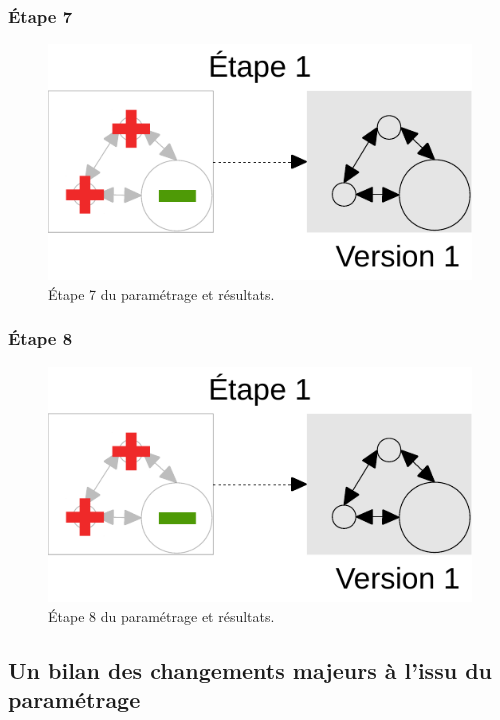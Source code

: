 \subsubsection{Étape 7}
\begin{figure}[H]
	\centering
	\includegraphics[width = \linewidth, page = 7]{img/schemas_etapes_individuelles.pdf}
	\caption{Étape 7 du paramétrage et résultats.}
\end{figure}

\pagebreak
\subsubsection{Étape 8}
\begin{figure}[H]
	\centering
	\includegraphics[width = \linewidth, page = 8]{img/schemas_etapes_individuelles.pdf}
	\caption{Étape 8 du paramétrage et résultats.}
\end{figure}
	
\pagebreak
\subsection{Un bilan des changements majeurs à l'issu du paramétrage}
	
